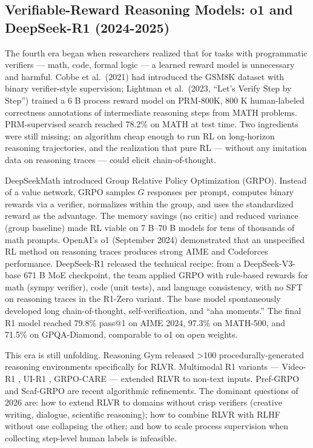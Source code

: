 \documentclass{article}
\begin{document}
\subsection{Verifiable-Reward Reasoning Models: o1 and DeepSeek-R1 (2024-2025)}\label{verifiable-reward-reasoning-models-o1-and-deepseek-r1-2024-2025}

The fourth era began when researchers realized that for tasks with programmatic verifiers --- math, code, formal logic --- a learned reward model is unnecessary and harmful. Cobbe et al.~(2021) had introduced the GSM8K dataset with binary verifier-style supervision; Lightman et al.~(2023, ``Let's Verify Step by Step'') trained a 6 B process reward model on PRM-800K, 800 K human-labeled correctness annotations of intermediate reasoning steps from MATH problems. PRM-supervised search reached 78.2\% on MATH at test time. Two ingredients were still missing: an algorithm cheap enough to run RL on long-horizon reasoning trajectories, and the realization that pure RL --- without any imitation data on reasoning traces --- could elicit chain-of-thought.

DeepSeekMath \citep{shao20242024} introduced Group Relative Policy Optimization (GRPO). Instead of a value network, GRPO samples \(G\) responses per prompt, computes binary rewards via a verifier, normalizes within the group, and uses the standardized reward as the advantage. The memory savings (no critic) and reduced variance (group baseline) made RL viable on 7 B--70 B models for tens of thousands of math prompts. OpenAI's o1 (September 2024) demonstrated that an unspecified RL method on reasoning traces produces strong AIME and Codeforces performance. DeepSeek-R1 \citep{guo20252025} released the technical recipe: from a DeepSeek-V3-base 671 B MoE checkpoint, the team applied GRPO with rule-based rewards for math (sympy verifier), code (unit tests), and language consistency, with no SFT on reasoning traces in the R1-Zero variant. The base model spontaneously developed long chain-of-thought, self-verification, and ``aha moments.'' The final R1 model reached 79.8\% pass@1 on AIME 2024, 97.3\% on MATH-500, and 71.5\% on GPQA-Diamond, comparable to o1 on open weights.

This era is still unfolding. Reasoning Gym \citep{stojanovski20252025} released \textgreater100 procedurally-generated reasoning environments specifically for RLVR. Multimodal R1 variants --- Video-R1 \citep{feng20252025}, UI-R1 \citep{lu20252025}, GRPO-CARE \citep{chen20252025} --- extended RLVR to non-text inputs. Pref-GRPO \citep{wang20252025} and Scaf-GRPO \citep{zhang20252025} are recent algorithmic refinements. The dominant questions of 2026 are: how to extend RLVR to domains without crisp verifiers (creative writing, dialogue, scientific reasoning); how to combine RLVR with RLHF without one collapsing the other; and how to scale process supervision when collecting step-level human labels is infeasible.
\end{document}

